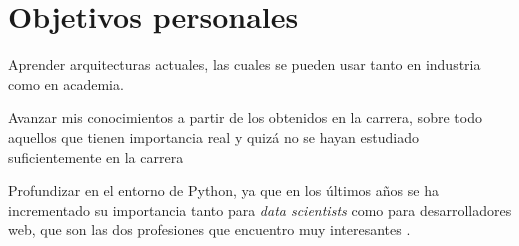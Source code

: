 \section{Objetivos personales}
\begin{list}{-}{}
\item Aprender arquitecturas actuales, las cuales se pueden usar tanto en industria como en academia.
\item Avanzar mis conocimientos a partir de los obtenidos en la carrera, sobre todo aquellos que tienen importancia real y quizá no se hayan estudiado suficientemente en la carrera
\item Profundizar en el entorno de Python, ya que en los últimos años se ha incrementado su importancia tanto para \textit{data scientists} como para desarrolladores web, que son las dos profesiones que encuentro muy interesantes \cite{ppl}.
\end{list}

